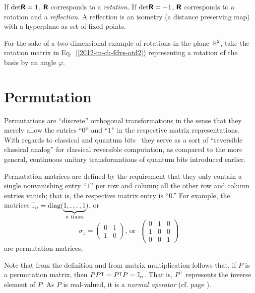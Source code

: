 If $\textrm{det} \textsf{\textbf{R}}=1$, $\textsf{\textbf{R}}$ corresponds to a {\em rotation.}
If $\textrm{det} \textsf{\textbf{R}}=-1$, $\textsf{\textbf{R}}$ corresponds to a rotation and a {\em reflection.}
A reflection is an isometry (a distance preserving map) with a hyperplane as set of fixed points.



{\color{blue}
\bexample
For the sake of a two-dimensional  example of rotations in the plane ${\Bbb R}^2$,
take the rotation matrix in Eq.~(\ref{2012-m-ch-fdvs-otd2})
representing a rotation of the basis by an angle $\varphi$.

\eexample
}


\section{Permutation}
\label{2018-permutation}

Permutations are ``discrete'' orthogonal transformations in the sense that
they merely allow the entries ``$0$'' and ``$1$'' in the respective matrix representations.
With regards to classical and quantum bits~\cite{mermin-04,mermin-07}
they serve as a sort of ``reversible classical analog'' for classical reversible computation,
as compared to the more general, continuous unitary transformations of quantum bits introduced earlier.

Permutation matrices are defined by the requirement that they only contain a single nonvanishing entry ``$1$'' per row and column;
all the other row and column entries vanish; that is, the respective matrix entry is ``$0$.''
For example, the matrices ${\Bbb I}_n=\textrm{diag}(\underbrace{1,\ldots ,1}_{n \textrm{ times}})$,
or
$$
\sigma_1=
\begin{pmatrix}
0&1\\
1&0
\end{pmatrix}
\textrm{, or }\;
\begin{pmatrix}
0&1&0\\
1&0&0\\
0&0&1
\end{pmatrix}
$$
are permutation matrices.

Note that from the definition and from matrix multiplication follows that,
if $P$ is a permutation matrix, then $PP^\intercal =P^\intercal  P={\Bbb I}_n$.
That is, $P^\intercal $ represents the inverse element of $P$.
As $P$ is real-valued, it is a {\em normal operator} (cf. page \pageref{2014-m-fdvs-normality}).


